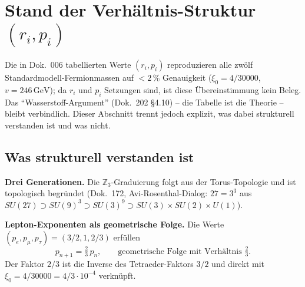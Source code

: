 \begin{center}
{\setlength{\hfuzz}{5pt}\scriptsize
{}}
\end{center}

\section{Stand der Verhältnis-Struktur \texorpdfstring{$(r_i, p_i)$}{(r_i, p_i)}}
\label{sec:stand-r-p}

Die in Dok.~006 tabellierten Werte $(r_i, p_i)$ reproduzieren alle
zwölf Standardmodell-Fermionmassen auf $<2\,\%$ Genauigkeit
($\xi_0 = 4/30000$, $v = 246\,\text{GeV}$); da $r_i$ und $p_i$
Setzungen sind, ist diese Übereinstimmung kein Beleg. Das
\enquote{Wasserstoff-Argument} (Dok.~202 §4.10) -- die Tabelle ist
die Theorie -- bleibt verbindlich. Dieser Abschnitt trennt jedoch
explizit, was dabei strukturell verstanden ist und was nicht.

\subsection{Was strukturell verstanden ist}

\textbf{Drei Generationen.} Die $\mathbb{Z}_3$-Graduierung folgt
aus der Torus-Topologie und ist topologisch begründet (Dok.~172,
Avi-Rosenthal-Dialog: $27 = 3^3$ aus
$SU(27) \supset SU(9)^3 \supset SU(3)^9 \supset
SU(3) \times SU(2) \times U(1)$).

\textbf{Lepton-Exponenten als geometrische Folge.}
Die Werte $(p_e, p_\mu, p_\tau) = (3/2, 1, 2/3)$ erfüllen
\begin{equation}
  p_{n+1} = \tfrac{2}{3}\, p_n, \qquad
  \text{geometrische Folge mit Verhältnis } \tfrac{2}{3}.
\end{equation}
Der Faktor $2/3$ ist die Inverse des Tetraeder-Faktors $3/2$ und
direkt mit $\xi_0 = 4/30000 = 4/3 \cdot 10^{-4}$ verknüpft.

